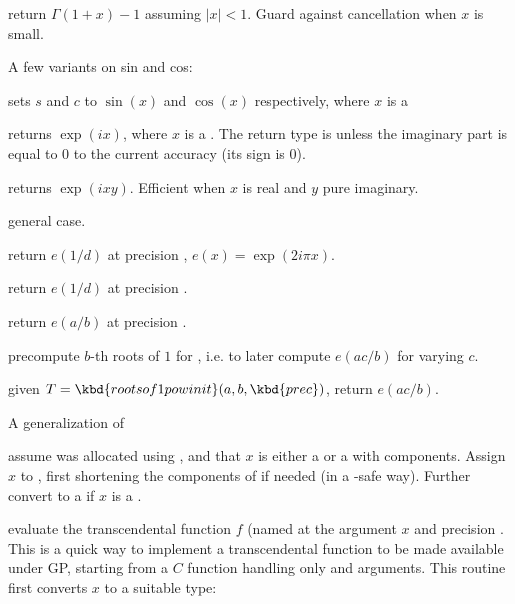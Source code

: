  return $\Gamma(1+x) - 1$ assuming
$|x| < 1$. Guard against cancellation when $x$ is small.

\noindent A few variants on sin and cos:

 sets $s$ and $c$ to
$\sin(x)$ and $\cos(x)$ respectively, where $x$ is a 

 returns $\exp(ix)$, where $x$ is a .
The return type is  unless the imaginary part is equal to $0$
to the current accuracy (its sign is $0$).

 returns $\exp(ixy)$. Efficient
when $x$ is real and $y$ pure imaginary.

 general case.

 return $e(1/d)$ at precision
, $e(x) = \exp(2i\pi x)$.

 return $e(1/d)$ at
precision .

 return $e(a/b)$ at
precision .

 precompute $b$-th
roots of $1$ for , i.e. to later compute $e(ac/b)$ for
varying $c$.

 given
$T = \kbd{rootsof1powinit}(a,b,\kbd{prec})$, return $e(ac/b)$.


\noindent A generalization of 

 assume  was allocated using
, and that $x$ is either a  or a 
with  components. Assign $x$ to , first shortening
the components of  if needed (in a -safe way). Further
convert  to a  if $x$ is a .

evaluate the transcendental function $f$ (named  at the argument
$x$ and precision . This is a quick way to implement a transcendental
function to be made available under GP, starting from a $C$ function
handling only  and  arguments. This routine first
converts $x$ to a suitable type:

